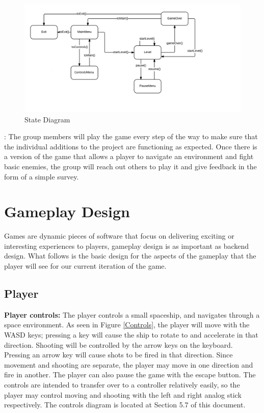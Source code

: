 \documentclass[12pt]{article}       %
\def\hs{\hspace{15pt}}
\begin{document}
\begin{figure} [H]
\centering
\includegraphics[width=7in]{PewPewStateDiagramFinal.png}
\caption{State Diagram} \label{StateDia}
\end{figure}

\hs {\bf Testing plans}: The group members will play the game every step of the way to make sure that the individual additions to the project are functioning as expected. Once there is a version of the game that allows a player to navigate an environment and fight basic enemies, the group will reach out others to play it and give feedback in the form of a simple survey. 

\section{Gameplay Design} %
\label{sec:GPdesign}

Games are dynamic pieces of software that focus on delivering exciting or interesting experiences to players, gameplay design is as important as backend design. What follows is the basic design for the aspects of the gameplay that the player will see for our current iteration of the game.

\subsection{Player} %

	{\bf Player controls: }The player controls a small spaceship, and navigates through a space environment. As seen in Figure \ref{Controls}, the player will move with the WASD keys; pressing a key will cause the ship to rotate to and accelerate in that direction.  Shooting will be controlled by the arrow keys on the keyboard. Pressing an arrow key will cause shots to be fired in that direction. Since movement and shooting are separate, the player may move in one direction and fire in another.  The player can also pause the game with the escape button. The controls are intended to transfer over to a controller relatively easily, so the player may control moving and shooting with the left and right analog stick respectively. The controls diagram is located at Section 5.7 of this document.
\end{document}
